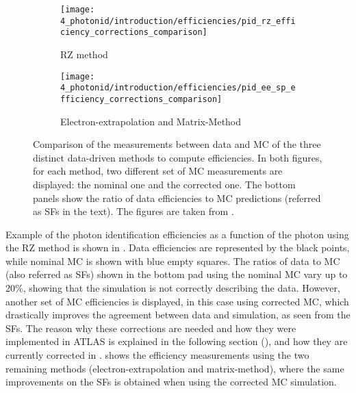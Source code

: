 \begin{figure}[ht!]
    \centering
    \begin{subfigure}[h]{0.49\linewidth}
        \centering
        \texttt{[image: 4\_photonid/introduction/efficiencies/pid\_rz\_efficiency\_corrections\_comparison]}
        \caption{\acf{RZ} method}
        \label{fig:pid_ss:pid:efficiencies:efficiencies_old:rz}
    \end{subfigure}
    \hfill
    \begin{subfigure}[h]{0.49\linewidth}
        \centering
        \texttt{[image: 4\_photonid/introduction/efficiencies/pid\_ee\_sp\_efficiency\_corrections\_comparison]}
        \caption{Electron-extrapolation and Matrix-Method}
        \label{fig:pid_ss:pid:efficiencies:efficiencies_old:ee_sp}
    \end{subfigure}
    \caption{Comparison of the measurements between data and \ac{MC} of the three distinct data-driven methods to compute efficiencies. In both figures, for each method, two different set of \ac{MC} measurements are displayed: the nominal one and the corrected one. The bottom panels show the ratio of data efficiencies to \ac{MC} predictions (referred as \acfp{SF} in the text). The figures are taken from .}
    \label{fig:pid_ss:pid:efficiencies:efficiencies_old}
\end{figure}


Example of the photon identification efficiencies as a function of the photon \pt using the \ac{RZ} method is shown in \Fig{\ref{fig:pid_ss:pid:efficiencies:efficiencies_old:rz}}. Data efficiencies are represented by the black points, while nominal \ac{MC} is shown with blue empty squares. The ratios of data to \ac{MC} (also referred as \acfp{SF}) shown in the bottom pad using the nominal \ac{MC} vary up to 20\%, showing that the simulation is not correctly describing the data. However, another set of \ac{MC} efficiencies is displayed, in this case using corrected \ac{MC}, which drastically improves the agreement between data and simulation, as seen from the \acp{SF}. The reason why these corrections are needed and how they were implemented in \ac{ATLAS} is explained in the following section (\Sect{\ref{sec:pid_ss:ss_differences}}), and how they are currently corrected in \Ch{\ref{ch:ss_corrections}}. \Fig{\ref{fig:pid_ss:pid:efficiencies:efficiencies_old:ee_sp}} shows the efficiency measurements using the two remaining methods (electron-extrapolation and matrix-method), where the same improvements on the \acp{SF} is obtained when using the corrected \ac{MC} simulation.

